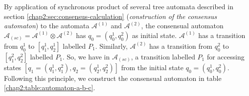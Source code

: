 By application of synchronous product of several tree automata described in section \ref{chap2:sec:consensus-calculation} (\textit{construction of the consensus automaton}) to the automata $\mathcal{A}^{(1)}$ and $\mathcal{A}^{(2)}$, the consensual automaton $\mathcal{A}_{(sc)}=\mathcal{A}^{(1)}\otimes\mathcal{A}^{(2)}$ has $q_{0}=(q_{0}^{1}, q_{0}^{2})$ as initial state. $\mathcal{A}^{(1)}$ has a transition from $q_{0}^{1}$ to $[q_{1}^{1}, q_{2}^{1}]$ labelled $P_{1}$. Similarly, $\mathcal{A}^{(2)}$ has a transition from $q_{0}^{2}$ to $[q_{1}^{2}, q_{2}^{2}]$ labelled $P_{1}$. So, we have in $\mathcal{A}_{(sc)}$, a transition labelled $P_{1}$ for accessing states $[q_{1}=(q_{1}^{1}, q_{1}^{2}), q_{2}=(q_{2}^{1}, q_{2}^{2})]$ from the initial state $q_{0}=(q_{0}^{1}, q_{0}^{2})$. Following this principle, we construct the consensual automaton in table \ref{chap2:table:automaton-a-b-c}. 
